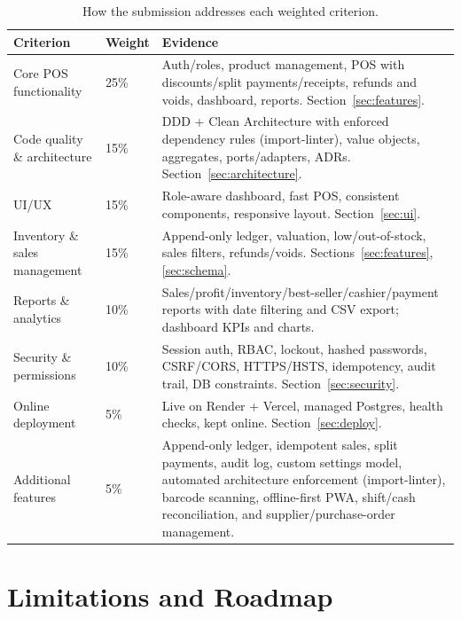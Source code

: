 \documentclass[11pt,a4paper]{article}
\begin{document}
\begin{table}[htbp]\centering
\small
\caption{How the submission addresses each weighted criterion.}
\begin{tabular}{@{}p{}p{}p{}@{}}
\toprule
\textbf{Criterion} & \textbf{Weight} & \textbf{Evidence} \\
\midrule
Core POS functionality & 25\% & Auth/roles, product management, POS with discounts/split
payments/receipts, refunds and voids, dashboard, reports. Section~\ref{sec:features}. \\
Code quality \& architecture & 15\% & DDD + Clean Architecture with enforced dependency rules
(import-linter), value objects, aggregates, ports/adapters, ADRs. Section~\ref{sec:architecture}. \\
UI/UX & 15\% & Role-aware dashboard, fast POS, consistent components, responsive layout.
Section~\ref{sec:ui}. \\
Inventory \& sales management & 15\% & Append-only ledger, valuation, low/out-of-stock, sales
filters, refunds/voids. Sections~\ref{sec:features}, \ref{sec:schema}. \\
Reports \& analytics & 10\% & Sales/profit/inventory/best-seller/cashier/payment reports with date
filtering and CSV export; dashboard KPIs and charts. \\
Security \& permissions & 10\% & Session auth, RBAC, lockout, hashed passwords, CSRF/CORS, HTTPS/HSTS,
idempotency, audit trail, DB constraints. Section~\ref{sec:security}. \\
Online deployment & 5\% & Live on Render + Vercel, managed Postgres, health checks, kept online.
Section~\ref{sec:deploy}. \\
Additional features & 5\% & Append-only ledger, idempotent sales, split payments, audit log, custom
settings model, automated architecture enforcement (import-linter), barcode scanning, offline-first
PWA, shift/cash reconciliation, and supplier/purchase-order management. \\
\bottomrule
\end{tabular}
\end{table}

\section{Limitations and Roadmap}
\label{sec:limitations}
\end{document}
